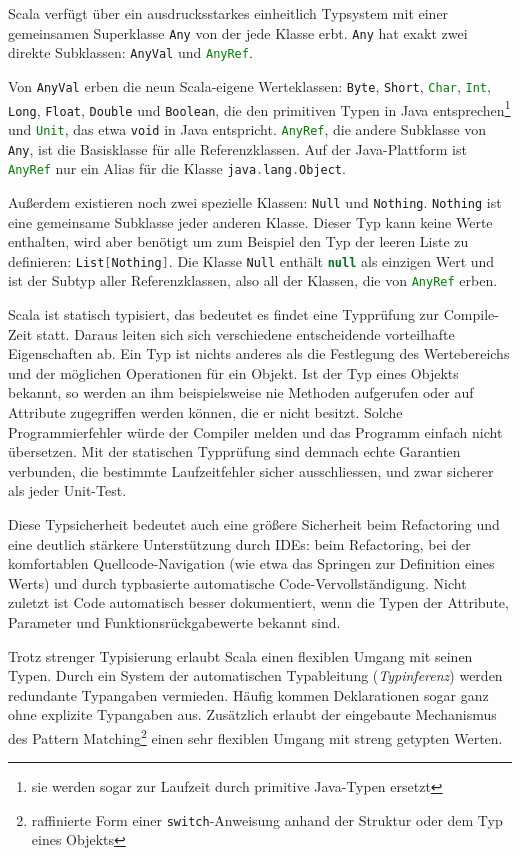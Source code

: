\documentclass[a4paper, 12pt, hidelinks, listof=totoc, listoftables=totoc, bibliography=totoc]{scrreprt}
\newcommand{\code}[1]{\lstinline[language=Scala, style=inline]|#1|}
\newcommand{\scala}[1]{\lstinline[language=Scala, style=inline]|#1|}
\begin{document}
Scala verfügt über ein ausdrucksstarkes einheitlich Typsystem mit einer gemeinsamen Superklasse \scala{Any} von der jede Klasse erbt. \scala{Any} hat exakt zwei direkte Subklassen: \scala{AnyVal} und \scala{AnyRef}. 

Von \scala{AnyVal} erben die neun Scala-eigene Werteklassen: \scala{Byte}, \scala{Short}, \scala{Char}, \scala{Int}, \scala{Long}, \scala{Float}, \scala{Double} und \scala{Boolean}, die den primitiven Typen in Java entsprechen\footnote{sie werden sogar zur Laufzeit durch primitive Java-Typen ersetzt} und \scala{Unit}, das etwa \scala{void} in Java entspricht. \scala{AnyRef}, die andere Subklasse von \scala{Any}, ist die Basisklasse für alle Referenzklassen. Auf der Java-Plattform ist \scala{AnyRef} nur ein Alias für die Klasse \mbox{\scala{java.lang.Object}}.

Außerdem existieren noch zwei spezielle Klassen: \scala{Null} und \scala{Nothing}. \scala{Nothing} ist eine gemeinsame Subklasse jeder anderen Klasse. Dieser Typ kann keine Werte enthalten, wird aber benötigt um zum Beispiel den Typ der leeren Liste zu definieren: \mbox{\scala{List[Nothing]}}. Die Klasse \scala{Null} enthält \scala{null} als einzigen Wert und ist der Subtyp aller Referenzklassen, also all der Klassen, die von \scala{AnyRef} erben.

Scala ist statisch typisiert, das bedeutet es findet eine Typprüfung zur Compile-Zeit statt. Daraus leiten sich sich verschiedene entscheidende vorteilhafte Eigenschaften ab. Ein Typ ist nichts anderes als die Festlegung des Wertebereichs und der möglichen Operationen für ein Objekt. Ist der Typ eines Objekts bekannt, so werden an ihm beispielsweise nie Methoden aufgerufen oder auf Attribute zugegriffen werden können, die er nicht besitzt. Solche Programmierfehler würde der Compiler melden und das Programm einfach nicht übersetzen. Mit der statischen Typprüfung sind demnach echte Garantien verbunden, die bestimmte Laufzeitfehler sicher ausschliessen, und zwar sicherer als jeder Unit-Test.

Diese Typsicherheit bedeutet auch eine größere Sicherheit beim Refactoring und eine deutlich stärkere Unterstützung durch IDEs: beim Refactoring, bei der komfortablen Quellcode-Navigation (wie etwa das Springen zur Definition eines Werts) und durch typbasierte automatische Code-Vervollständigung. Nicht zuletzt ist Code automatisch besser dokumentiert, wenn die Typen der Attribute, Parameter und Funktionsrückgabewerte bekannt sind.

Trotz strenger Typisierung erlaubt Scala einen flexiblen Umgang mit seinen Typen. Durch ein System der automatischen Typableitung (\emph{Typinferenz}) werden redundante Typangaben vermieden. Häufig kommen Deklarationen sogar ganz ohne explizite Typangaben aus. Zusätzlich erlaubt der eingebaute Mechanismus des Pattern Matching\footnote{raffinierte Form einer \code{switch}-Anweisung anhand der Struktur oder dem Typ eines Objekts} einen sehr flexiblen Umgang mit streng getypten Werten.
\end{document}
